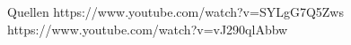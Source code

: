 \begin{frame}{Quellen}
    https://www.youtube.com/watch?v=SYLgG7Q5Zws
    https://www.youtube.com/watch?v=vJ290qlAbbw

\end{frame}